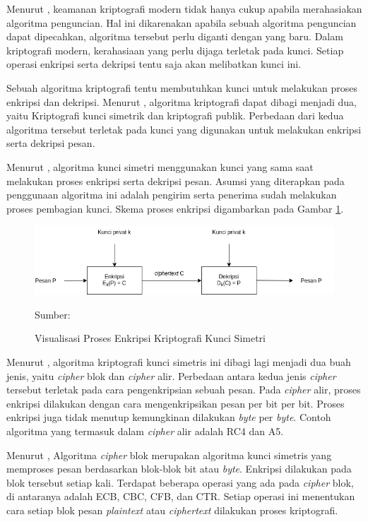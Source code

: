 Menurut \textcite{schneier1996}, keamanan kriptografi modern tidak hanya cukup apabila merahasiakan algoritma penguncian. Hal ini dikarenakan apabila sebuah algoritma penguncian dapat dipecahkan, algoritma tersebut perlu diganti dengan yang baru. Dalam kriptografi modern, kerahasiaan yang perlu dijaga terletak pada kunci. Setiap operasi enkripsi serta dekripsi tentu saja akan melibatkan kunci ini. 

Sebuah algoritma kriptografi tentu membutuhkan kunci untuk melakukan proses enkripsi dan dekripsi. Menurut \textcite{schneier1996}, algoritma kriptografi dapat dibagi menjadi dua, yaitu Kriptografi kunci simetrik dan kriptografi publik. Perbedaan dari kedua algoritma tersebut terletak pada kunci yang digunakan untuk melakukan enkripsi serta dekripsi pesan. 

Menurut \textcite{munir2019}, algoritma kunci simetri menggunakan kunci yang sama saat melakukan proses enkripsi serta dekripsi pesan. Asumsi yang diterapkan pada penggunaan algoritma ini adalah pengirim serta penerima sudah melakukan proses pembagian kunci. Skema proses enkripsi digambarkan pada Gambar \ref{fig:crypto.symetric}.

\begin{figure}[!h]
  \centering
  \includegraphics[width=\textwidth]{chapters/res/chapter-2/img/crypto.symetric.png}
  \caption{Visualisasi Proses Enkripsi Kriptografi Kunci Simetri} \label{fig:crypto.symetric}
  Sumber: \textcite{munir2019}
\end{figure}

Menurut \textcite{munir2019}, algoritma kriptografi kunci simetris ini dibagi lagi menjadi dua buah jenis, yaitu \emph{cipher} blok dan \emph{cipher} alir. Perbedaan antara kedua jenis \emph{cipher} tersebut terletak pada cara pengenkripsian sebuah pesan. Pada \emph{cipher} alir, proses enkripsi dilakukan dengan cara mengenkripsikan pesan per bit per bit. Proses enkripsi juga tidak menutup kemungkinan dilakukan \emph{byte} per \emph{byte}. Contoh algoritma yang termasuk dalam \emph{cipher} alir adalah RC4 dan A5.

Menurut \textcite{munir2019}, Algoritma \emph{cipher} blok merupakan algoritma kunci simetris yang memproses pesan berdasarkan blok-blok bit atau \emph{byte}. Enkripsi dilakukan pada blok tersebut setiap kali. Terdapat beberapa operasi yang ada pada \emph{cipher} blok, di antaranya adalah ECB, CBC, CFB, dan CTR. Setiap operasi ini menentukan cara setiap blok pesan \emph{plaintext} atau \emph{ciphertext} dilakukan proses kriptografi.



